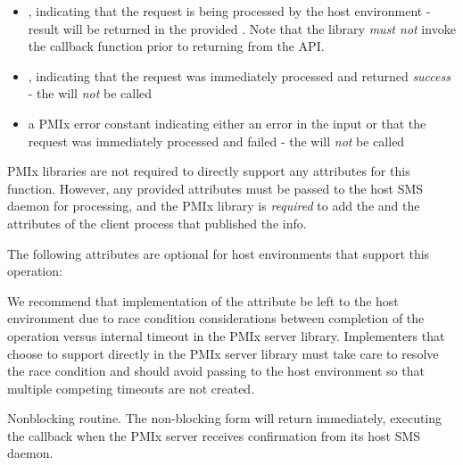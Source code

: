\begin{itemize}
    \item {}, indicating that the request is being processed by the host environment - result will be returned in the provided . Note that the library \emph{must not} invoke the callback function prior to returning from the \ac{API}.
    \item {}, indicating that the request was immediately processed and returned \textit{success} - the  will \textit{not} be called
    \item a PMIx error constant indicating either an error in the input or that the request was immediately processed and failed - the  will \textit{not} be called
\end{itemize}

\reqattrstart
\ac{PMIx} libraries are not required to directly support any attributes for this function. However, any provided attributes must be passed to the host \ac{SMS} daemon for processing, and the \ac{PMIx} library is \textit{required} to add the  and the  attributes of the client process that published the info.

\reqattrend

\optattrstart
The following attributes are optional for host environments that support this operation:


\optattrend

\adviceimplstart
We recommend that implementation of the  attribute be left to the host environment due to race condition considerations between completion of the operation versus internal timeout in the \ac{PMIx} server library. Implementers that choose to support  directly in the \ac{PMIx} server library must take care to resolve the race condition and should avoid passing  to the host environment so that multiple competing timeouts are not created.
\adviceimplend

\descr

Nonblocking  routine. The non-blocking form will return immediately, executing the callback when the \ac{PMIx} server receives confirmation from its host \ac{SMS} daemon.

